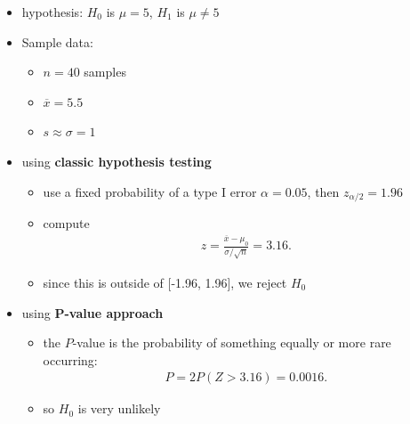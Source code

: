 \documentclass[10pt]{article}
\begin{document}
\begin{itemize}
    \item hypothesis: $H_0$ is $\mu=5$, $H_1$ is $\mu \neq 5$ 
    \item Sample data: 
        \begin{itemize}
            \item $n=40$ samples 
            \item $\overline{x}=5.5$ 
            \item $s \approx \sigma = 1$
        \end{itemize}
    \item using \textbf{classic hypothesis testing}
        \begin{itemize}
            \item use a fixed probability of a type I error $\alpha = 0.05$, then $z_{\alpha / 2}= 1.96$ 
            \item compute 
                \begin{gather*}
                    z = \frac{\overline{x}-\mu_0}{\sigma / \sqrt{n}} = 3.16
                .\end{gather*}
            \item since this is outside of [-1.96, 1.96], we reject $H_0$
        \end{itemize}
    \item using \textbf{P-value approach}
        \begin{itemize}
            \item the $P$-value is the probability of something equally or more rare occurring: 
                \begin{gather*}
                    P = 2P(Z>3.16) = 0.0016
                .\end{gather*}
            \item so $H_0$ is very unlikely
        \end{itemize}
\end{itemize}
\end{document}
